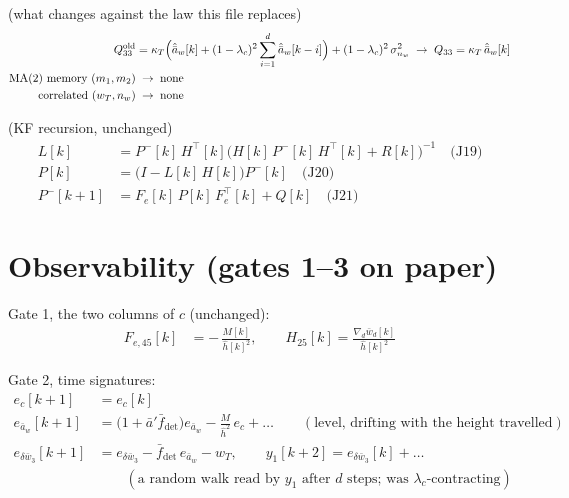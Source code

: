 \documentclass[11pt,a4paper,fontset=none]{ctexart}
\newcommand{\ba}{\bar{a}}
\newcommand{\bw}{\bar{w}}
\newcommand{\ap}{\ba'}
\newcommand{\ah}{\hat{\ba}_w}
\newcommand{\hh}{\hat{h}}
\newcommand{\lc}{\lambda_c}
\newcommand{\fdet}{\bar{f}_{\det}}
\newcommand{\J}[1]{\quad\text{(J#1)}}
\begin{document}
(what changes against the law this file replaces)
\begin{align*}
Q_{33}^{\mathrm{old}} &= \kappa_T\Bigl(\ah[k] + (1-\lc)^{2}\sum_{i=1}^{d}\ah[k-i]\Bigr) + (1-\lc)^{2}\,\sigma^{2}_{n_w}
\;\to\; Q_{33} = \kappa_T\,\ah[k] \\
\text{MA(2) memory } (m_1, m_2) &\;\to\; \text{none} \\
\text{correlated } (w_T, n_w) &\;\to\; \text{none}
\end{align*}

(KF recursion, unchanged)
\begin{align*}
L[k]        &= P^{-}[k]\,H^{\top}[k]\bigl(H[k]\,P^{-}[k]\,H^{\top}[k] + R[k]\bigr)^{-1} \J{19} \\
P[k]        &= \bigl(I - L[k]\,H[k]\bigr)P^{-}[k] \J{20} \\
P^{-}[k+1]  &= F_e[k]\,P[k]\,F_e^{\top}[k] + Q[k] \J{21}
\end{align*}

\section{Observability (gates 1--3 on paper)}

Gate 1, the two columns of $c$ (unchanged):
\begin{align*}
F_{e,45}[k] &= -\,\frac{M[k]}{\hh[k]^{2}}, \qquad H_{25}[k] = \frac{\nabla_d\bw_d[k]}{\hh[k]^{2}}
\end{align*}

Gate 2, time signatures:
\begin{align*}
e_c[k+1] &= e_c[k] \\
e_{\ba_w}[k+1] &= \bigl(1 + \ap\fdet\bigr)e_{\ba_w} - \frac{M}{\hh^{2}}\,e_c + \dots \qquad(\text{level, drifting with the height travelled}) \\
e_{\delta\bw_3}[k+1] &= e_{\delta\bw_3} - \fdet\,e_{\ba_w} - w_T, \qquad y_1[k+2] = e_{\delta\bw_3}[k] + \dots \\
                      &\qquad(\text{a random walk read by } y_1 \text{ after } d \text{ steps; was } \lc\text{-contracting})
\end{align*}
\end{document}
